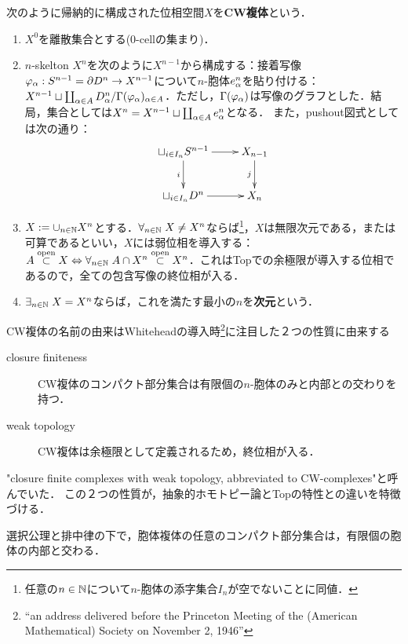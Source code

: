\documentclass[uplatex,dvipdfmx]{jsreport}
\begin{document}
\begin{definition}
    次のように帰納的に構成された位相空間$X$を\textbf{CW複体}という．
    \begin{enumerate}
        \item $X^0$を離散集合とする($0$-cellの集まり)．
        \item $n$-skelton $X^n$を次のように$X^{n-1}$から構成する：接着写像$\varphi_\alpha:S^{n-1}=\partial D^n\to X^{n-1}$について$n$-胞体$e^n_\alpha$を貼り付ける：$X^{n-1}\sqcup\coprod_{\alpha\in A}D^n_\alpha/\Gamma(\varphi_\alpha)_{\alpha\in A}$．ただし，$\Gamma(\varphi_\alpha)$は写像のグラフとした．結局，集合としては$X^{n}=X^{n-1}\sqcup\coprod_{\alpha\in A}e^n_\alpha$となる．
        また，pushout図式としては次の通り：
        \[\xymatrix{
        \sqcup_{i\in I_n}S^{n-1}\ar[d]_-i\ar[r]&X_{n-1}\ar[d]_-j\\
        \sqcup_{i\in I_n}D^n\ar[r]&X_n
        }\]
        \item $X:=\cup_{n\in\mathbb{N}}X^n$とする．$\forall_{n\in\mathbb{N}}\;X\ne X^n$ならば\footnote{任意の$n\in\mathbb{N}$について$n$-胞体の添字集合$I_n$が空でないことに同値．}，$X$は無限次元である，または可算であるといい，$X$には弱位相を導入する：$A\overset{\mathrm{open}}{\subset} X\Leftrightarrow\forall_{n\in\mathbb{N}}\;A\cap X^n\overset{\mathrm{open}}{\subset} X^n$．これはTopでの余極限が導入する位相であるので，全ての包含写像の終位相が入る．
        \item $\exists_{n\in\mathbb{N}}\;X=X^n$ならば，これを満たす最小の$n$を\textbf{次元}という．
    \end{enumerate}
\end{definition}
\begin{history}
    CW複体の名前の由来はWhiteheadの導入時\footnote{“an address delivered before the Princeton Meeting of the (American Mathematical) Society on November 2, 1946”}に注目した２つの性質に由来する
    \begin{description}
        \item[closure finiteness] CW複体のコンパクト部分集合は有限個の$n$-胞体のみと内部との交わりを持つ．
        \item[weak topology] CW複体は余極限として定義されるため，終位相が入る．
    \end{description}
    "closure finite complexes with weak topology, abbreviated to CW-complexes"と呼んでいた．
    この２つの性質が，抽象的ホモトピー論とTopの特性との違いを特徴づける．
\end{history}

\begin{lemma}
    選択公理と排中律の下で，胞体複体の任意のコンパクト部分集合は，有限個の胞体の内部と交わる．
\end{lemma}
\end{document}
